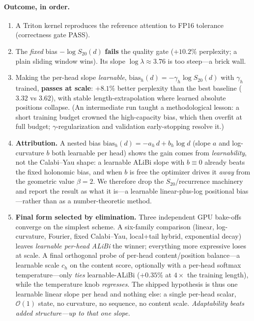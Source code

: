 \documentclass[11pt,a4paper]{article}
\theoremstyle{definition}
\theoremstyle{remark}
\newcommand{\Sx}{S_{20}}
\begin{document}
\paragraph{Outcome, in order.}
\begin{enumerate}\itemsep2pt
\item A Triton kernel reproduces the reference attention to FP16 tolerance
  (correctness gate PASS).
\item The \emph{fixed} bias $-\log\Sx(d)$ \textbf{fails} the quality gate
  ($+10.2\%$ perplexity; a plain sliding window wins). Its slope
  $\log\lambda\approx 3.76$ is too steep---a brick wall.
\item Making the per-head slope \emph{learnable},
  $\mathrm{bias}_h(d)=-\gamma_h\log\Sx(d)$ with $\gamma_h$ trained, \textbf{passes
  at scale}: $+8.1\%$ better perplexity than the best baseline ($3.32$ vs
  $3.62$), with stable length-extrapolation where learned absolute positions
  collapse. (An intermediate run taught a methodological lesson: a short
  training budget crowned the high-capacity bias, which then overfit at full
  budget; $\gamma$-regularization and validation early-stopping resolve it.)
\item \textbf{Attribution.} A nested bias $\mathrm{bias}_h(d)=-a_h\,d+b_h\log d$
  (slope $a$ and log-curvature $b$ both learnable per head) shows the gain comes
  from \emph{learnability}, not the Calabi--Yau shape: a learnable ALiBi slope
  with $b\equiv0$ already beats the fixed holonomic bias, and when $b$ is free
  the optimizer drives it \emph{away} from the geometric value $\beta=2$. We
  therefore drop the $\Sx$/recurrence machinery and report the result as what it
  is---a learnable linear-plus-log positional bias---rather than as a
  number-theoretic method.
\item \textbf{Final form selected by elimination.} Three independent GPU bake-offs
  converge on the simplest scheme. A six-family comparison (linear, log-curvature,
  Fourier, fixed Calabi--Yau, local+tail hybrid, exponential decay) leaves
  \emph{learnable per-head ALiBi} the winner; everything more expressive loses at
  scale. A final orthogonal probe of per-head content/position balance---a learnable
  scale $c_h$ on the content score, optionally with a per-head softmax
  temperature---only \emph{ties} learnable-ALiBi ($+0.35\%$ at $4\times$ the
  training length), while the temperature knob \emph{regresses}. The shipped
  hypothesis is thus one learnable linear slope per head and nothing else: a single
  per-head scalar, $\mathcal{O}(1)$ state, no curvature, no sequence, no content
  scale. \emph{Adaptability beats added structure---up to that one slope.}
\end{enumerate}
\end{document}
